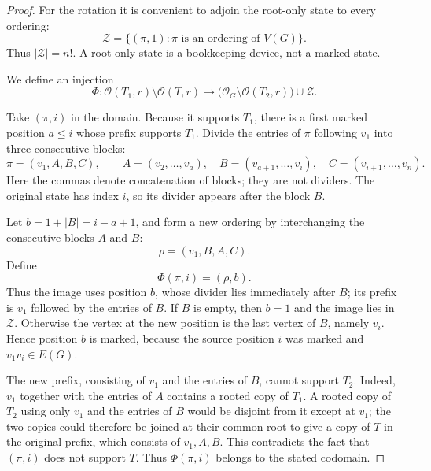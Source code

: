 \documentclass[11pt]{article}
\numberwithin{equation}{section}
\theoremstyle{definition}
\newcommand{\cO}{\mathcal O}
\newcommand{\cZ}{\mathcal Z}
\begin{document}
\begin{proof}
For the rotation it is convenient to adjoin the root-only state to every
ordering:
\[
        \cZ=\{(\pi,1):\pi\text{ is an ordering of }V(G)\}.
\]
Thus $|\cZ|=n!$.  A root-only state is a bookkeeping device, not a marked
state.

We define an injection
\begin{equation}
 \Phi:\cO(T_1,r)\setminus\cO(T,r)
 \longrightarrow
 \bigl(\cO_G\setminus\cO(T_2,r)\bigr)\cup\cZ.
 \label{eq:branch-injection}
\end{equation}

Take $(\pi,i)$ in the domain.  Because it supports $T_1$, there is a first
marked position $a\leq i$ whose prefix supports $T_1$.
Divide the entries of $\pi$ following $v_1$ into three consecutive blocks:
\[
 \pi=(v_1,A,B,C),
 \qquad
 A=(v_2,\ldots,v_a),
 \quad B=(v_{a+1},\ldots,v_i),
 \quad C=(v_{i+1},\ldots,v_n).
\]
Here the commas denote concatenation of blocks; they are not dividers.  The
original state has index $i$, so its divider appears after the block $B$.

Let $b=1+|B|=i-a+1$, and form a new ordering by interchanging the
consecutive blocks $A$ and $B$:
\[
        \rho=(v_1,B,A,C).
\]
Define
\begin{equation}
        \Phi(\pi,i)=(\rho,b).
 \label{eq:rotation}
\end{equation}
Thus the image uses position $b$, whose divider lies immediately after $B$;
its prefix is
$v_1$ followed by the entries of $B$.  If $B$ is empty, then $b=1$ and the
image lies in $\cZ$.  Otherwise the vertex at the new position is the last
vertex of $B$, namely $v_i$.  Hence position $b$ is marked, because the
source position $i$ was marked and $v_1v_i\in E(G)$.

The new prefix, consisting of $v_1$ and the entries of $B$, cannot support
$T_2$.  Indeed, $v_1$ together with the entries of $A$ contains a rooted
copy of $T_1$.  A rooted copy of $T_2$ using only $v_1$ and the entries of
$B$ would be disjoint from it except at $v_1$; the two copies could
therefore be joined at their common root to give a copy of $T$ in the
original prefix, which consists of $v_1,A,B$.  This contradicts the fact
that $(\pi,i)$ does not support $T$.  Thus $\Phi(\pi,i)$ belongs to the
stated codomain.


\end{proof}
\end{document}
